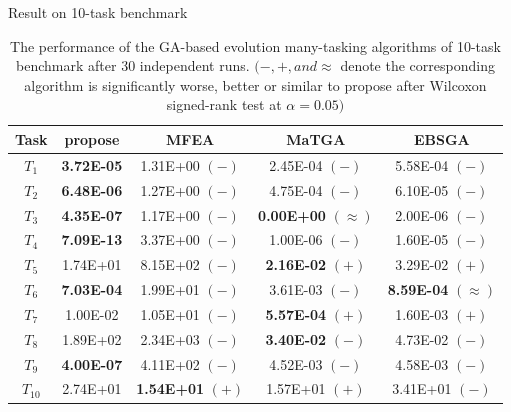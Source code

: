 \begin{frame}{Result on 10-task benchmark}
    \begin{table}[H]
        \begin{tabular}{@{}ccccc@{}}
            \toprule
            \textbf{Task} & \gls{propose} & MFEA & MaTGA & EBSGA \\ \midrule
            $T_1$ & \textbf{3.72E-05}   & 1.31E+00 $(-)$          & 2.45E-04          $(-)$ & 5.58E-04 $(-)$ \\
            $T_2$ & \textbf{6.48E-06}   & 1.27E+00 $(-)$          & 4.75E-04          $(-)$ & 6.10E-05 $(-)$ \\
            $T_3$ & \textbf{4.35E-07}   & 1.17E+00 $(-)$          & \textbf{0.00E+00} $(\approx)$ & 2.00E-06 $(-)$ \\
            $T_4$ & \textbf{7.09E-13}   & 3.37E+00 $(-)$          & 1.00E-06          $(-)$ & 1.60E-05 $(-)$ \\
            $T_5$ & 1.74E+01            & 8.15E+02 $(-)$          & \textbf{2.16E-02} $(+)$ & 3.29E-02 $(+)$ \\
            $T_6$ & \textbf{7.03E-04}   & 1.99E+01 $(-)$          & 3.61E-03          $(-)$ & \textbf{8.59E-04} $(\approx)$ \\
            $T_7$ & 1.00E-02            & 1.05E+01 $(-)$          & \textbf{5.57E-04} $(+)$ & 1.60E-03 $(+)$ \\
            $T_8$ & 1.89E+02            & 2.34E+03 $(-)$          & \textbf{3.40E-02} $(-)$ & 4.73E-02 $(-)$ \\
            $T_9$ & \textbf{4.00E-07}   & 4.11E+02 $(-)$          & 4.52E-03          $(-)$ & 4.58E-03 $(-)$ \\
            $T_{10}$ & 2.74E+01            & \textbf{1.54E+01} $(+)$ & 1.57E+01          $(+)$ & 3.41E+01 $(-)$ \\
            \bottomrule
        \end{tabular}
        \caption{The performance of the GA-based evolution many-tasking algorithms of 10-task benchmark after 30 independent runs. $(-, +, and \approx$ denote the corresponding algorithm is significantly worse, better or similar to \gls{propose} after Wilcoxon signed-rank test at $\alpha=0.05 )$}
        \label{tab:last10}
    \end{table}
\end{frame}

